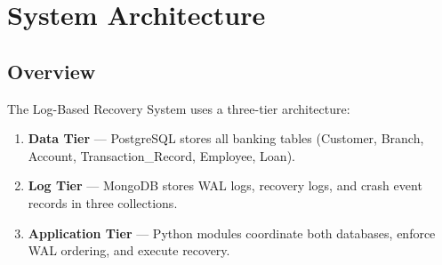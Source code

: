 
\chapter{System Architecture}

\section{Overview}

The Log-Based Recovery System uses a three-tier architecture:

\begin{enumerate}
  \item \textbf{Data Tier} --- PostgreSQL stores all banking tables
        (Customer, Branch, Account, Transaction\_Record, Employee, Loan).
  \item \textbf{Log Tier} --- MongoDB stores WAL logs, recovery logs,
        and crash event records in three collections.
  \item \textbf{Application Tier} --- Python modules coordinate both
        databases, enforce WAL ordering, and execute recovery.
\end{enumerate}

